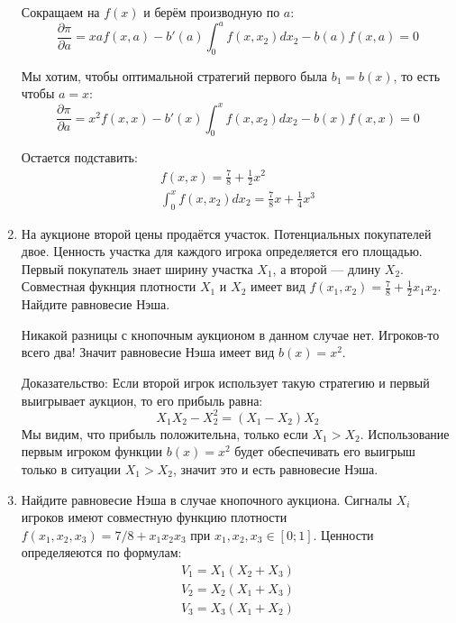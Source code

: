 \begin{enumerate}
Сокращаем на $ f(x) $ и берём производную по $ a $:
\begin{equation}
\frac{\partial \pi}{\partial a}=xaf(x,a)-b'(a)\int_{0}^{a}f(x,x_{2})dx_{2}-b(a)f(x,a)=0
\end{equation}


Мы хотим, чтобы оптимальной стратегий первого была $ b_{1}=b(x) $, то есть чтобы $ a=x $:
\begin{equation}
\frac{\partial \pi}{\partial a}=x^{2}f(x,x)-b'(x)\int_{0}^{x}f(x,x_{2})dx_{2}-b(x)f(x,x)=0
\end{equation}

Остается подставить:
\begin{equation}
\begin{array}{c}
f(x,x)=\frac{7}{8}+\frac{1}{2}x^{2} \\
\int_{0}^{x}f(x,x_{2})dx_{2}=\frac{7}{8}x+\frac{1}{4}x^{3}
\end{array}
\end{equation}


\item На аукционе второй цены продаётся участок. Потенциальных покупателей двое. Ценность участка для каждого игрока определяется его площадью. Первый покупатель знает ширину участка $ X_{1} $, а второй — длину $X_{2}$. Совместная фукнция плотности $ X_{1} $ и $ X_{2} $ имеет вид $ f(x_{1},x_{2})=\frac{7}{8}+\frac{1}{2}x_{1}x_{2} $. Найдите равновесие Нэша.

Никакой разницы с кнопочным аукционом в данном случае нет. Игроков-то всего два! Значит равновесие Нэша имеет вид $ b(x)=x^{2} $.

Доказательство:
Если второй игрок использует такую стратегию и первый выигрывает аукцион, то его прибыль равна:
\begin{equation}
X_{1}X_{2}-X_{2}^{2}=(X_{1}-X_{2})X_{2}
\end{equation}
Мы видим, что прибыль положительна, только если $ X_{1}>X_{2} $. Использование первым игроком функции $ b(x)=x^{2} $ будет обеспечивать его выигрыш только в ситуации $ X_{1}>X_{2} $, значит это и есть равновесие Нэша.


\item Найдите равновесие Нэша в случае кнопочного аукциона. Сигналы $ X_{i} $ игроков имеют совместную функцию плотности $ f(x_{1},x_{2},x_{3})=7/8+x_{1}x_{2}x_{3} $ при $ x_{1},x_{2},x_{3}\in[0;1] $. Ценности определяеются по формулам:
\begin{equation}
\begin{array}{c}
V_{1}=X_{1}(X_{2}+X_{3}) \\
V_{2}=X_{2}(X_{1}+X_{3}) \\
V_{3}=X_{3}(X_{1}+X_{2})
\end{array}
\end{equation}


\end{enumerate}
